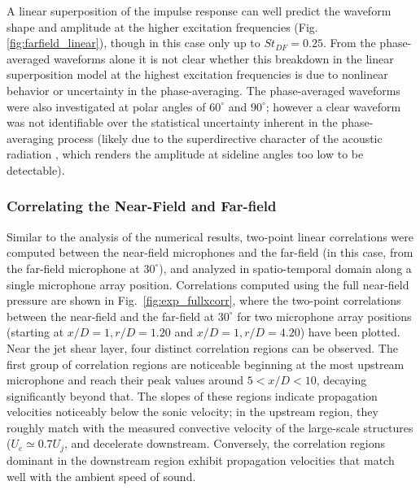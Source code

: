 \documentclass[english]{aiaa-tc}
\newcommand*{\fig}[1]{Fig.~\ref{#1}}
\begin{document}
A linear superposition of the impulse response can well predict the waveform shape and amplitude at the higher excitation frequencies (Fig. \ref{fig:farfield_linear}), though in this case only up to $St_{DF}  = 0.25$.
From the phase-averaged waveforms alone it is not clear whether this breakdown in the linear superposition model at the highest excitation frequencies is due to nonlinear behavior or uncertainty in the phase-averaging.
The phase-averaged waveforms were also investigated at polar angles of $60^\circ$ and $90^\circ$; however a clear waveform was not identifiable over the statistical uncertainty inherent in the phase-averaging process (likely due to the superdirective character of the acoustic radiation \cite{Crighton1990}, which renders the amplitude at sideline angles too low to be detectable).

\subsubsection{Correlating the Near-Field and Far-field}
Similar to the analysis of the numerical results, two-point linear correlations were computed between the near-field microphones and the far-field (in this case, from the far-field microphone at $30^{\circ}$), and analyzed in spatio-temporal domain along a single microphone array position.
Correlations computed using the full near-field pressure are shown in \fig{fig:exp_fullxcorr}, where the two-point correlations between the near-field and the far-field at $30^\circ$ for two microphone array positions (starting at $x/D = 1, r/D = 1.20$ and $x/D = 1, r/D = 4.20$) have been plotted.
Near the jet shear layer, four distinct correlation regions can be observed.
The first group of correlation regions are noticeable beginning at the most upstream microphone and reach their peak values around $5 < x/D < 10$, decaying significantly beyond that.
The slopes of these regions indicate propagation velocities noticeably below the sonic velocity; in the upstream region, they roughly match with the measured convective velocity of the large-scale structures ($U_c \simeq 0.7 U_j$, and decelerate downstream.
Conversely, the correlation regions dominant in the downstream region exhibit propagation velocities that match well with the ambient speed of sound.
\end{document}

